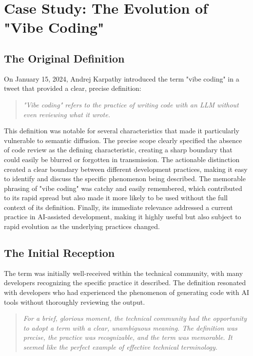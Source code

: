 \documentclass[11pt]{article}
\begin{document}
\section{Case Study: The Evolution of "Vibe Coding"}

\subsection{The Original Definition}

On January 15, 2024, Andrej Karpathy introduced the term "vibe coding" in a tweet that provided a clear, precise definition:

\begin{quote}
\emph{"Vibe coding" refers to the practice of writing code with an LLM without even reviewing what it wrote.}
\end{quote}

This definition was notable for several characteristics that made it particularly vulnerable to semantic diffusion. The precise scope clearly specified the absence of code review as the defining characteristic, creating a sharp boundary that could easily be blurred or forgotten in transmission. The actionable distinction created a clear boundary between different development practices, making it easy to identify and discuss the specific phenomenon being described. The memorable phrasing of "vibe coding" was catchy and easily remembered, which contributed to its rapid spread but also made it more likely to be used without the full context of its definition. Finally, its immediate relevance addressed a current practice in AI-assisted development, making it highly useful but also subject to rapid evolution as the underlying practices changed.

\subsection{The Initial Reception}

The term was initially well-received within the technical community, with many developers recognizing the specific practice it described. The definition resonated with developers who had experienced the phenomenon of generating code with AI tools without thoroughly reviewing the output.

\begin{quote}
\emph{For a brief, glorious moment, the technical community had the opportunity to adopt a term with a clear, unambiguous meaning. The definition was precise, the practice was recognizable, and the term was memorable. It seemed like the perfect example of effective technical terminology.}
\end{quote}
\end{document}
